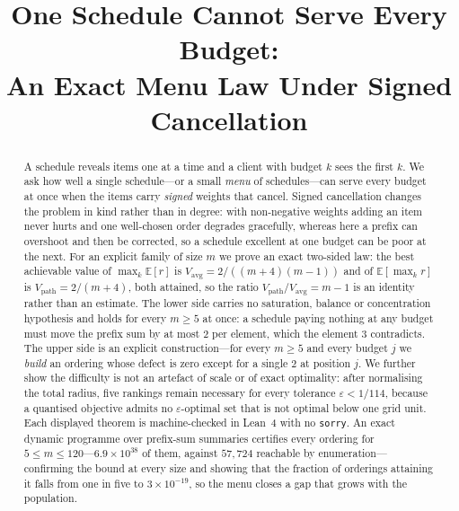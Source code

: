 



\title{One Schedule Cannot Serve Every Budget:\\
An Exact Menu Law Under Signed Cancellation}

\author{
}

\maketitle

\begin{abstract}
A schedule reveals items one at a time and a client with budget $k$ sees the first $k$. We
ask how well a single schedule---or a small \emph{menu} of schedules---can serve every budget
at once when the items carry \emph{signed} weights that cancel. Signed cancellation changes
the problem in kind rather than in degree: with non-negative weights adding an item never
hurts and one well-chosen order degrades gracefully, whereas here a prefix can overshoot and
then be corrected, so a schedule excellent at one budget can be poor at the next. For an
explicit family of size $m$ we prove an exact two-sided law: the best achievable value of
$\max_{k}\mathbb{E}[r]$ is $V_{\mathrm{avg}}=2/((m+4)(m-1))$ and of
$\mathbb{E}[\max_{k}r]$ is $V_{\mathrm{path}}=2/(m+4)$, both attained, so the ratio
$V_{\mathrm{path}}/V_{\mathrm{avg}}=m-1$ is an identity rather than an estimate. The lower
side carries no saturation, balance or concentration hypothesis and holds for every $m\ge5$
at once: a schedule paying nothing at any budget must move the prefix sum by at most $2$ per
element, which the element $3$ contradicts. The upper side is an explicit construction---for
every $m\ge5$ and every budget $j$ we \emph{build} an ordering whose defect is zero except
for a single $2$ at position $j$. We further show the difficulty is not an artefact of
scale or of exact optimality: after normalising the total radius, five rankings remain
necessary for every tolerance $\varepsilon<1/114$, because a quantised objective admits no
$\varepsilon$-optimal set that is not optimal below one grid unit. Each displayed theorem is
machine-checked in Lean~4 with no \texttt{sorry}. An exact dynamic programme over
prefix-sum summaries certifies every ordering for $5\le m\le120$---$6.9\times10^{38}$ of
them, against $57{,}724$ reachable by enumeration---confirming the bound at every size and
showing that the fraction of orderings attaining it falls from one in five to
$3\times10^{-19}$, so the menu closes a gap that grows with the population.
\end{abstract}

